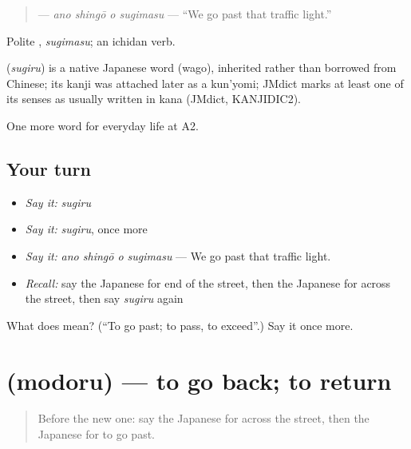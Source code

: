 \begin{quote}
\textbf{  } — \emph{ano shingō o sugimasu} — \textquotedblleft{}We go past that traffic light.\textquotedblright{}
\end{quote}

Polite \textbf{}, \emph{sugimasu}; an ichidan verb.

\begin{cousinweb}
\textbf{} (\emph{sugiru}) is a native Japanese word (wago), inherited rather than borrowed from Chinese; its kanji was attached later as a kun'yomi; JMdict marks at least one of its senses as usually written in kana (JMdict, KANJIDIC2).
\end{cousinweb}

\begin{grammarlens}[title={What you've built}]
One more word for everyday life at A2.
\end{grammarlens}

\subsection*{Your turn}
\begin{itemize}
\raggedright
  \item \emph{Say it:} \emph{sugiru}
  \item \emph{Say it:} \emph{sugiru}, once more
  \item \emph{Say it:} \emph{ano shingō o sugimasu} — We go past that traffic light.
  \item \emph{Recall:} say the Japanese for end of the street, then the Japanese for across the street, then say \emph{sugiru} again
\end{itemize}

\begin{tcolorbox}[breakable,colback=teal!4,colframe=teal!35!black,title={Before you move on}]
What does  mean? (\textquotedblleft{}To go past; to pass, to exceed\textquotedblright{}.) Say it once more.
\end{tcolorbox}
\section[\texorpdfstring{\ja{もどる} (modoru)}{もどる (modoru)}]{ (modoru) — to go back; to return}

\label{lesson:JA-C195-modoru}



\begin{quote}
Before the new one: say the Japanese for across the street, then the Japanese for to go past.
\end{quote}

